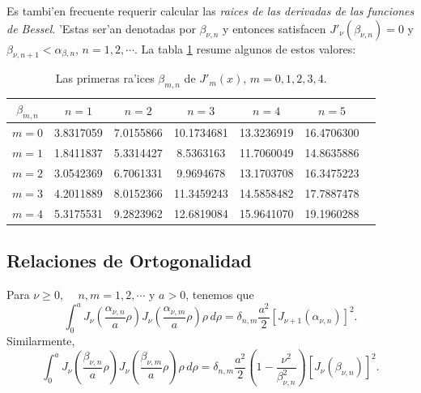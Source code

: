 Es tambi'en frecuente requerir calcular las \textit{raices de las derivadas de las funciones de Bessel}. 'Estas ser'an denotadas por $\beta_{\nu,n}$ y entonces satisfacen $J'_\nu(\beta_{\nu,n})=0$ y $\beta_{\nu,n+1}<\alpha_{\beta,n}$, $n=1,2,\cdots$. La tabla  \ref{tabla:betanun} resume algunos de estos valores:
\begin{table}
\begin{center}
\begin{tabular}{ccccccc}
\hline $\beta_{m,n}$ & $n=1$ & $n=2$ & $n=3$ & $n=4$ & $n=5$ \\ \hline 
$m=0$ & 3.8317059 &  7.0155866 & 10.1734681 & 13.3236919 & 16.4706300\\
$m=1$ & 1.8411837 &  5.3314427 &  8.5363163 & 11.7060049 & 14.8635886 \\
$m=2$ & 3.0542369 &  6.7061331 &  9.9694678 & 13.1703708 & 16.3475223 \\
$m=3$ & 4.2011889 &  8.0152366 & 11.3459243 & 14.5858482 & 17.7887478 \\
$m=4$ & 5.3175531 &  9.2823962 & 12.6819084 & 15.9641070 & 19.1960288 \\
\hline 
\end{tabular} 
\caption{Las primeras ra'ices $\beta_{m,n}$ de $J'_m(x)$, $m=0,1,2,3,4$.}
\label{tabla:betanun}
\end{center}
\end{table}

\subsection{Relaciones de Ortogonalidad}
Para $\nu\ge 0$, $\quad n,m=1,2,\cdots$ y $a>0$, tenemos que
\begin{equation}\label{roJnualpha}
\int_0^a J_\nu\left(\frac{\alpha_{\nu,n}}{a}\rho\right)J_\nu\left(\frac{\alpha_{\nu,m}}{a}\rho\right)\rho \, d\rho=\delta_{n,m}\frac{a^2}{2}\left[J_{\nu+1}(\alpha_{\nu,n})\right]^2.
\end{equation}
Similarmente,
\begin{equation}\label{roJnubeta}
\int_0^a J_\nu\left(\frac{\beta_{\nu,n}}{a}\rho\right)J_\nu\left(\frac{\beta_{\nu,m}}{a}\rho\right)\rho \, d\rho=\delta_{n,m}\frac{a^2}{2}\left(1-\frac{\nu^2}{\beta_{\nu,n}^2}\right)\left[J_\nu(\beta_{\nu,n})\right]^2.
\end{equation}

